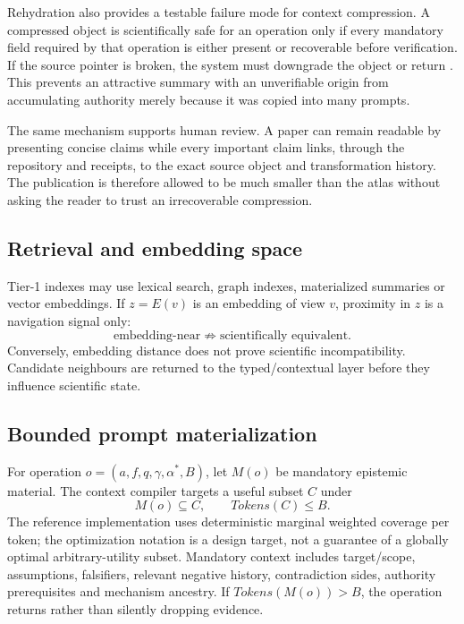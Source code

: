 Rehydration also provides a testable failure mode for context compression. A compressed object is scientifically safe for an operation only if every mandatory field required by that operation is either present or recoverable before verification. If the source pointer is broken, the system must downgrade the object or return \CannotCheck{}. This prevents an attractive summary with an unverifiable origin from accumulating authority merely because it was copied into many prompts.

The same mechanism supports human review. A paper can remain readable by presenting concise claims while every important claim links, through the repository and receipts, to the exact source object and transformation history. The publication is therefore allowed to be much smaller than the atlas without asking the reader to trust an irrecoverable compression.

\subsection{Retrieval and embedding space}
Tier-1 indexes may use lexical search, graph indexes, materialized summaries or vector embeddings. If $z=E(v)$ is an embedding of view $v$, proximity in $z$ is a navigation signal only:
\begin{equation}\text{embedding-near}\not\Rightarrow\text{scientifically equivalent}.
\end{equation}
Conversely, embedding distance does not prove scientific incompatibility. Candidate neighbours are returned to the typed/contextual layer before they influence scientific state.

\subsection{Bounded prompt materialization}
For operation $o=(a,f,q,\gamma,\alpha^*,B)$, let $M(o)$ be mandatory epistemic material. The context compiler targets a useful subset $C$ under
\begin{equation}M(o)\subseteq C,\qquad Tokens(C)\le B.
\end{equation}
The reference implementation uses deterministic marginal weighted coverage per token; the optimization notation is a design target, not a guarantee of a globally optimal arbitrary-utility subset. Mandatory context includes target/scope, assumptions, falsifiers, relevant negative history, contradiction sides, authority prerequisites and mechanism ancestry. If $Tokens(M(o))>B$, the operation returns \CannotCompile{} rather than silently dropping evidence.

